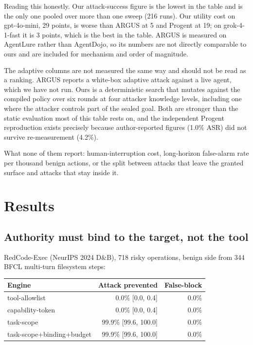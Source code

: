 \documentclass[11pt]{article}
\begin{document}
Reading this honestly. Our attack-success figure is the lowest in the table and
is the only one pooled over more than one sweep (216 runs). Our utility cost on
gpt-4o-mini, 29 points, is worse than ARGUS at 5 and Progent at 19; on
grok-4-1-fast it is 3 points, which is the best in the table. ARGUS is measured
on AgentLure rather than AgentDojo, so its numbers are not directly comparable
to ours and are included for mechanism and order of magnitude.

The adaptive columns are not measured the same way and should not be read as a
ranking. ARGUS reports a white-box adaptive attack against a live agent, which
we have not run. Ours is a deterministic search that mutates against the
compiled policy over six rounds at four attacker knowledge levels, including one
where the attacker controls part of the sealed goal. Both are stronger than the
static evaluation most of this table rests on, and the independent Progent
reproduction exists precisely because author-reported figures (1.0\% ASR) did
not survive re-measurement (4.2\%).

What none of them report: human-interruption cost, long-horizon false-alarm rate
per thousand benign actions, or the split between attacks that leave the granted
surface and attacks that stay inside it.

\section{Results}

\subsection{Authority must bind to the target, not the tool}

RedCode-Exec (NeurIPS 2024 D\&B), 718 risky operations, benign side from 344
BFCL multi-turn filesystem steps:

\begin{center}
\small
\begin{tabular}{@{}lrr@{}}
\toprule
\textbf{Engine} & \textbf{Attack prevented} & \textbf{False-block} \\
\midrule
tool-allowlist & 0.0\% [0.0, 0.4] & 0.0\% \\
capability-token & 0.0\% [0.0, 0.4] & 0.0\% \\
task-scope & 99.9\% [99.6, 100.0] & 0.0\% \\
task-scope+binding+budget & 99.9\% [99.6, 100.0] & 0.0\% \\
\bottomrule
\end{tabular}
\end{center}
\end{document}
